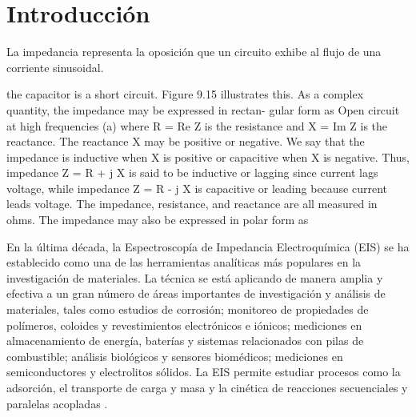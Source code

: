 \documentclass[fleqn,11pt]{SelfArx}
\begin{document}
	\flushbottom %
	
	\maketitle %
	
	
	\thispagestyle{empty} %
	\renewcommand{\tablename}{Tabla} 
	
	
	
	\section*{Introducci\'on}
	La impedancia representa la oposici\'on que un circuito exhibe al flujo de una corriente sinusoidal.	
	
	the capacitor is a short circuit. Figure 9.15 illustrates this.
	As a complex quantity, the impedance may be expressed in rectan-
	gular form as
	Open circuit at
	high frequencies
	(a)
	where R = Re Z is the resistance and X = Im Z is the reactance. The
	reactance X may be positive or negative. We say that the impedance is
	inductive when X is positive or capacitive when X is negative. Thus,
	impedance Z = R + j X is said to be inductive or lagging since current
	lags voltage, while impedance Z = R - j X is capacitive or leading
	because current leads voltage. The impedance, resistance, and reactance
	are all measured in ohms. The impedance may also be expressed in polar
	form as
	
	En la última década, la Espectroscopía de Impedancia Electroquímica (EIS) se ha establecido como una de las herramientas analíticas más populares en la investigación de materiales. La técnica se está aplicando de manera amplia y efectiva a un gran número de áreas importantes de investigación y análisis de materiales, tales como estudios de corrosión; monitoreo de propiedades de polímeros, coloides y revestimientos electrónicos e iónicos; mediciones en almacenamiento de energía, baterías y sistemas relacionados con pilas de combustible; análisis biológicos y sensores biomédicos; mediciones en semiconductores y electrolitos sólidos. La EIS permite estudiar procesos como la adsorción, el transporte de carga y masa y la cinética de reacciones secuenciales y paralelas acopladas \cite{lvovich2012impedance}.
	
\end{document}
